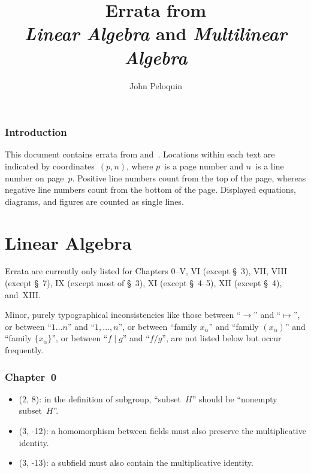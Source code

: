 \documentclass[letterpaper,12pt]{article}
\title{Errata from \\\textit{Linear Algebra} and \textit{Multilinear Algebra}}
\author{John Peloquin}
\date{}
\newcommand{\divides}{\mid}
\begin{document}
\maketitle

\section*{Introduction}
This document contains errata from \cite{greub1} and~\cite{greub2}. Locations within each text are indicated by coordinates~\((p,n)\), where \(p\)~is a page number and \(n\)~is a line number on page~\(p\). Positive line numbers count from the top of the page, whereas negative line numbers count from the bottom of the page. Displayed equations, diagrams, and figures are counted as single lines.

\newpage
\part*{Linear Algebra}
Errata are currently only listed for Chapters 0--V, VI (except \S~3), VII, VIII (except \S~7), IX (except most of \S~3), XI (except \S~4--5), XII (except \S~4), and~XIII.

Minor, purely typographical inconsistencies like those between ``\(\to\)'' and ``\(\mapsto\)'', or between ``\(1\ldots n\)'' and ``\(1,\ldots,n\)'', or between ``family \(x_{\alpha}\)'' and ``family \((x_{\alpha})\)'' and ``family \(\{x_{\alpha}\}\)'', or between ``\(f\divides g\)'' and ``\(f/g\)'', are not listed below but occur frequently.

\section*{Chapter~0}
\begin{itemize}
\item (2, 8): in the definition of subgroup, ``subset~\(H\)'' should be ``nonempty subset~\(H\)''.
\item (3, -12): a homomorphism between fields must also preserve the multiplicative identity.
\item (3, -13): a subfield must also contain the multiplicative identity.
\end{itemize}
\end{document}
